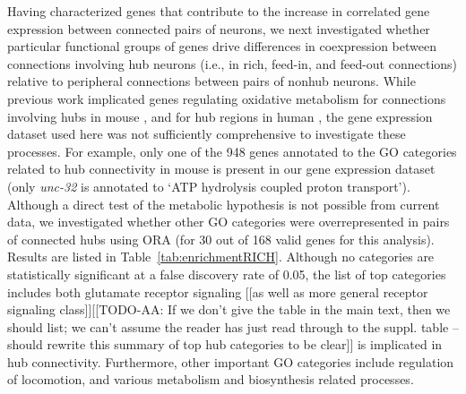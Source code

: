 \documentclass[10pt,letterpaper]{article}
\begin{document}
{Having characterized genes that contribute to the increase in correlated gene expression between connected pairs of neurons, we next investigated whether particular functional groups of genes drive differences in coexpression between connections involving hub neurons (i.e., in rich, feed-in, and feed-out connections) relative to peripheral connections between pairs of nonhub neurons.
While previous work implicated genes regulating oxidative metabolism for connections involving hubs in mouse \cite{Fulcher:2016ck}, and for hub regions in human \cite{Vertes2016a}, the gene expression dataset used here was not sufficiently comprehensive to investigate these processes.
For example, only one of the 948 genes annotated to the GO categories related to hub connectivity in mouse is present in our gene expression dataset (only \emph{unc-32} is annotated to `ATP hydrolysis coupled proton transport').
Although a direct test of the metabolic hypothesis is not possible from current data, we investigated whether other GO categories were overrepresented in pairs of connected hubs using ORA (for 30 out of 168 valid genes for this analysis).
Results are listed in Table~\ref{tab:enrichmentRICH}.
Although no categories are statistically significant at a false discovery rate of 0.05, the list of top categories includes both glutamate receptor signaling [[as well as more general receptor signaling class]][[TODO-AA: If we don't give the table in the main text, then we should list; we can't assume the reader has just read through to the suppl. table -- should rewrite this summary of top hub categories to be clear]] is implicated in hub connectivity.
Furthermore, other important GO categories include regulation of locomotion, and various metabolism and biosynthesis related processes. 


}
\end{document}
